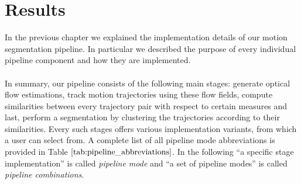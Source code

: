 \chapter{Results}
In the previous chapter we explained the implementation details of our motion segmentation pipeline. In particular we described the purpose of every individual pipeline component and how they are implemented. \\ \\
In summary, our pipeline consists of the following main stages: generate optical flow estimations, track motion trajectories using these flow fields, compute similarities between every trajectory pair with respect to certain measures and last, perform a segmentation by clustering the trajectories according to their similarities. Every such stages offers various implementation variants, from which a user can select from. A complete list of all pipeline mode abbreviations is provided in Table $\ref{tab:pipeline_abbreviations}$. In the following \enquote{a specific stage implementation} is called \textit{pipeline mode} and \enquote{a set of pipeline modes} is called \textit{pipeline combinations}.

